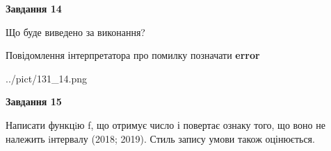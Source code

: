 \documentclass[11pt, ukrainian]{article}
\begin{document}
{\begin {large}
{\begin {center}\textbf{Завдання 14}\end {center}}\par
Що буде виведено за виконання? \par
Повідомлення інтерпретатора про помилку позначати \textbf{error}

\begin{center}
	{../pict/131_14.png}
\end{center}
\newpage

{\begin {center}\textbf{Завдання 15}\end {center}}\par

Написати функцiю f, що отримує число і повертає ознаку того, що воно не належить iнтервалу (2018; 2019). Стиль запису умови також оцінюється.\par
\newpage

\end {large}}
\end{document}
